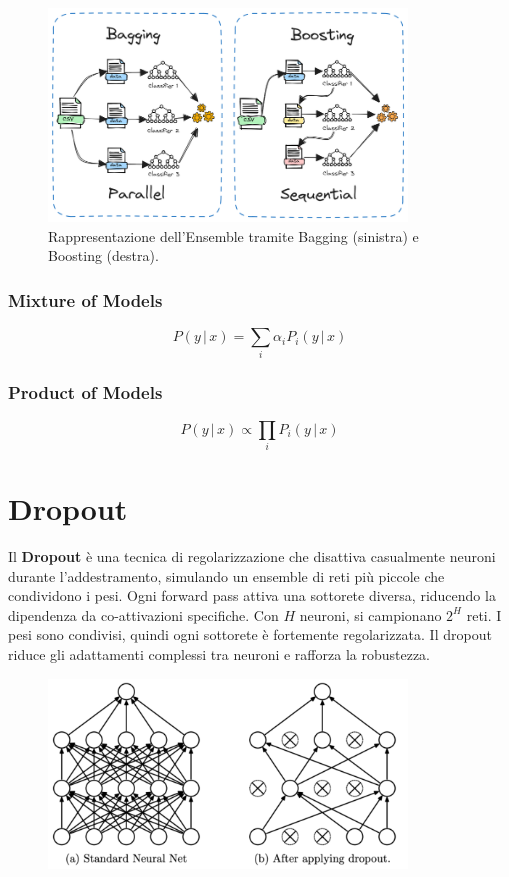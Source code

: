 \begin{figure}
    \centering
    \includegraphics[width=0.85\textwidth]{figure/BagBoost.png}
    \caption{Rappresentazione dell’Ensemble tramite Bagging (sinistra) e Boosting (destra).}
    \label{fig:bagBoost}
\end{figure}

\subsubsection{Mixture of Models}
\[
P(y\,|\,x) = \sum_i \alpha_i P_i(y\,|\,x)
\]

\subsubsection{Product of Models}
\[
P(y\,|\,x) \propto \prod_i P_i(y\,|\,x)
\]

\section{Dropout}

Il \textbf{Dropout} è una tecnica di regolarizzazione che disattiva casualmente neuroni durante l’addestramento, simulando un ensemble di reti più piccole che condividono i pesi. Ogni forward pass attiva una sottorete diversa, riducendo la dipendenza da co-attivazioni specifiche. Con \( H \) neuroni, si campionano \( 2^H \) reti. I pesi sono condivisi, quindi ogni sottorete è fortemente regolarizzata. Il dropout riduce gli adattamenti complessi tra neuroni e rafforza la robustezza.

\begin{figure}
    \centering
    \includegraphics[width=0.85\textwidth]{figure/Dropout.png}
    \label{fig:dropout}
\end{figure}

